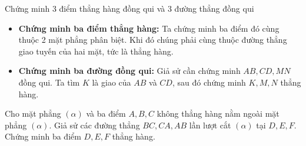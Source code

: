 \begin{dang}{Chứng minh 3 điểm thẳng hàng đồng qui và 3 đường thẳng đồng qui}
	\begin{itemize}
		\item {\bf Chứng minh ba điểm thẳng hàng:} Ta chứng minh ba điểm đó cùng thuộc 2 mặt phẳng phân biệt. Khi đó chúng phải cùng thuộc đường thẳng giao tuyến của hai mặt, tức là thẳng hàng.
		\item {\bf Chứng minh ba đường đồng qui:} Giả sử cần chứng minh $AB, CD, MN$ đồng qui. Ta tìm $K$ là giao của $AB$ và $CD$, sau đó chứng minh $K, M, N$ thẳng hàng.
	\end{itemize}
\end{dang}	
\begin{vd}%
	Cho mặt phẳng  $(\alpha)$ và ba điểm $A, B, C$ không thẳng hàng nằm ngoài mặt phẳng  $(\alpha)$. Giả sử các đường thẳng $BC, CA, AB$ lần lượt cắt  $(\alpha)$  tại $D, E, F$. Chứng minh ba điểm $D, E, F$ thẳng hàng.
\end{vd}

